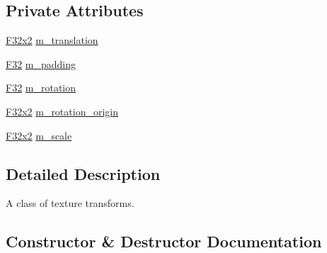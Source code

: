 \subsection*{Private Attributes}
\begin{DoxyCompactItemize}
\item 
\mbox{\hyperlink{namespacemage_aee4759dedc8def6c6dec26b5c7eddf29}{F32x2}} \mbox{\hyperlink{classmage_1_1_texture_transform_a1a8adc206e6b6f7e3ec255fc82e73524}{m\+\_\+translation}}
\item 
\mbox{\hyperlink{namespacemage_aa97e833b45f06d60a0a9c4fc22ae02c0}{F32}} \mbox{\hyperlink{classmage_1_1_texture_transform_a49845212aa6b85f73f9ca2101748bb13}{m\+\_\+padding}}
\item 
\mbox{\hyperlink{namespacemage_aa97e833b45f06d60a0a9c4fc22ae02c0}{F32}} \mbox{\hyperlink{classmage_1_1_texture_transform_aa9b56aac4354fa7f37caee42451f60d1}{m\+\_\+rotation}}
\item 
\mbox{\hyperlink{namespacemage_aee4759dedc8def6c6dec26b5c7eddf29}{F32x2}} \mbox{\hyperlink{classmage_1_1_texture_transform_af991dbcc669e2af4d78531b50fc60175}{m\+\_\+rotation\+\_\+origin}}
\item 
\mbox{\hyperlink{namespacemage_aee4759dedc8def6c6dec26b5c7eddf29}{F32x2}} \mbox{\hyperlink{classmage_1_1_texture_transform_adb36217d25494721ee54cd6807ea65af}{m\+\_\+scale}}
\end{DoxyCompactItemize}


\subsection{Detailed Description}
A class of texture transforms. 

\subsection{Constructor \& Destructor Documentation}
\mbox{\label{classmage_1_1_texture_transform_ab473e1998fac7a7d03093d9e7f6ad210}} 
